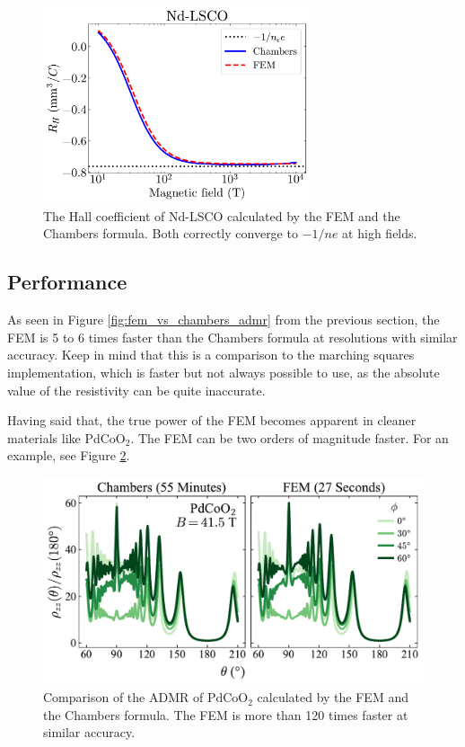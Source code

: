 \documentclass[12pt]{article}
\begin{document}
\begin{figure}%
    \centering
    \includegraphics[width=0.7\textwidth]{figures/fem_vs_chambers_rh}
    \caption{The Hall coefficient of Nd-LSCO calculated by the FEM and the Chambers formula.
        Both correctly converge to $-1/ne$ at high fields.}
    \label{fig:fem_vs_chambers_rh}
\end{figure}

\subsection{Performance}
As seen in Figure \ref{fig:fem_vs_chambers_admr} from the previous section, the FEM is 5 to 6
times faster than the Chambers formula at resolutions with similar accuracy. Keep in mind that
this is a comparison to the marching squares implementation, which is faster but not always
possible to use, as the absolute value of the resistivity can be quite inaccurate.

Having said that, the true power of the FEM becomes apparent in cleaner materials like PdCoO$_2$.
The FEM can be two orders of magnitude faster. For an example, see Figure
\ref{fig:fem_vs_chambers_pdcoo2}.

\begin{figure}
    \centering
    \includegraphics[width=\textwidth]{figures/fem_vs_chambers_pdcoo2}
    \caption{Comparison of the ADMR of PdCoO$_2$ calculated by the FEM and the Chambers
        formula. The FEM is more than 120 times faster at similar accuracy.}
    \label{fig:fem_vs_chambers_pdcoo2}
\end{figure}
\end{document}
